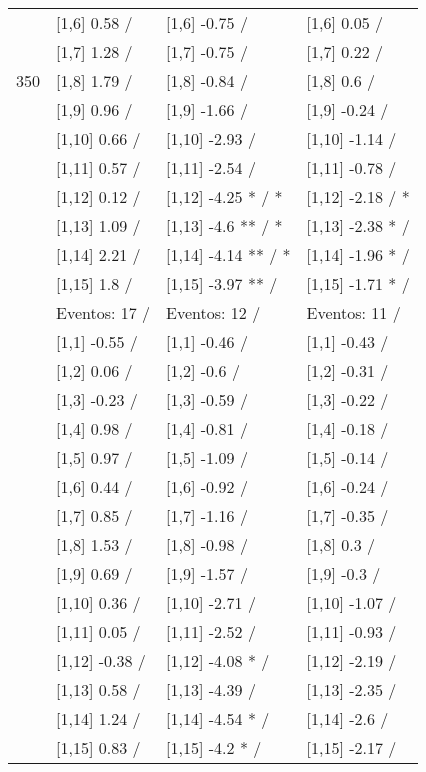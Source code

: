 \begin{table}
\begin{tabular}[t]{llll}
 & {}[1,6] 0.58  / & {}[1,6] -0.75  / & {}[1,6] 0.05  /\\
 & {}[1,7] 1.28  / & {}[1,7] -0.75  / & {}[1,7] 0.22  /\\
350 & {}[1,8] 1.79  / & {}[1,8] -0.84  / & {}[1,8] 0.6  /\\
\addlinespace
 & {}[1,9] 0.96  / & {}[1,9] -1.66  / & {}[1,9] -0.24  /\\
 & {}[1,10] 0.66  / & {}[1,10] -2.93  / & {}[1,10] -1.14  /\\
 & {}[1,11] 0.57  / & {}[1,11] -2.54  / & {}[1,11] -0.78  /\\
 & {}[1,12] 0.12  / & {}[1,12] -4.25 * / * & {}[1,12] -2.18  / *\\
 & {}[1,13] 1.09  / & {}[1,13] -4.6 ** / * & {}[1,13] -2.38 * /\\
\addlinespace
 & {}[1,14] 2.21  / & {}[1,14] -4.14 ** / * & {}[1,14] -1.96 * /\\
 & {}[1,15] 1.8  / & {}[1,15] -3.97 ** / & {}[1,15] -1.71 * /\\
 & Eventos:  17 / & Eventos:  12 / & Eventos:  11 /\\
 & {}[1,1] -0.55  / & {}[1,1] -0.46  / & {}[1,1] -0.43  /\\
 & {}[1,2] 0.06  / & {}[1,2] -0.6  / & {}[1,2] -0.31  /\\
\addlinespace
 & {}[1,3] -0.23  / & {}[1,3] -0.59  / & {}[1,3] -0.22  /\\
 & {}[1,4] 0.98  / & {}[1,4] -0.81  / & {}[1,4] -0.18  /\\
 & {}[1,5] 0.97  / & {}[1,5] -1.09  / & {}[1,5] -0.14  /\\
 & {}[1,6] 0.44  / & {}[1,6] -0.92  / & {}[1,6] -0.24  /\\
 & {}[1,7] 0.85  / & {}[1,7] -1.16  / & {}[1,7] -0.35  /\\
\addlinespace
500 & {}[1,8] 1.53  / & {}[1,8] -0.98  / & {}[1,8] 0.3  /\\
 & {}[1,9] 0.69  / & {}[1,9] -1.57  / & {}[1,9] -0.3  /\\
 & {}[1,10] 0.36  / & {}[1,10] -2.71  / & {}[1,10] -1.07  /\\
 & {}[1,11] 0.05  / & {}[1,11] -2.52  / & {}[1,11] -0.93  /\\
 & {}[1,12] -0.38  / & {}[1,12] -4.08 * / & {}[1,12] -2.19  /\\
\addlinespace
 & {}[1,13] 0.58  / & {}[1,13] -4.39  / & {}[1,13] -2.35  /\\
 & {}[1,14] 1.24  / & {}[1,14] -4.54 * / & {}[1,14] -2.6  /\\
 & {}[1,15] 0.83  / & {}[1,15] -4.2 * / & {}[1,15] -2.17  /\\
\bottomrule
\end{tabular}
\end{table}
